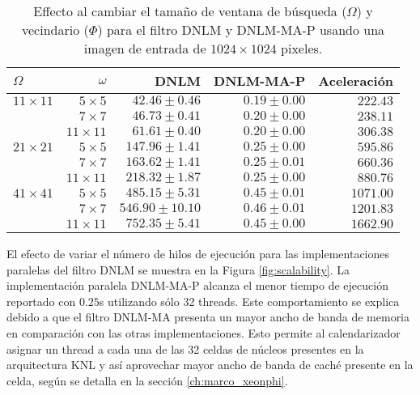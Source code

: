 \begin{table}
\protect\caption[Efecto al cambiar parámetros $\Omega$ y $\Phi$]{Effecto al cambiar el tama\~no de ventana de búsqueda ($\Omega$) y vecindario ($\Phi$) para el filtro DNLM y DNLM-MA-P usando una imagen de entrada de  $1024 \times 1024$ pixeles. \label{tabla:scala2}}
\centering
\begin{tabular}{lrrrr}
$\Omega$  & $\omega$ & DNLM \left[s\right]& DNLM-MA-P \left[s\right]& Aceleración \left[x\right]\tabularnewline
\hline
$11 \times 11$ & $5 \times 5$ & $42.46\pm0.46$ & $0.19\pm0.00$ & $222.43$ \tabularnewline
 & $7 \times 7$ & $46.73\pm0.41$ & $0.20\pm0.00$ & $238.11$ \tabularnewline
 & $11 \times 11$ & $61.61\pm0.40$ & $0.20\pm0.00$ & $306.38$ \tabularnewline
$21 \times 21$ & $5 \times 5$ & $147.96\pm1.41$ & $0.25\pm0.00$ & $595.86$ \tabularnewline
 & $7 \times 7$ & $163.62\pm1.41$ & $0.25\pm0.01$ & $660.36$ \tabularnewline
 & $11 \times 11$ & $218.32\pm1.87$ & $0.25\pm0.00$ & $880.76$ \tabularnewline
 $41 \times 41$ & $5 \times 5$ & $485.15\pm5.31$ & $0.45\pm0.01$ & $1071.00$ \tabularnewline
 & $7 \times 7$ & $546.90\pm10.10$ & $0.46\pm0.01$ & $1201.83$ \tabularnewline
 & $11 \times 11$ & $752.35\pm5.41$ & $0.45\pm0.00$ & $1662.90$ \tabularnewline
\end{tabular}
\end{table}




El efecto de variar el número de hilos de ejecución para las implementaciones paralelas del filtro DNLM se muestra en la Figura \ref{fig:scalability}. La implementación paralela DNLM-MA-P alcanza el menor tiempo de ejecución reportado con $0.25$s utilizando sólo 32 threads. Este comportamiento se explica debido a que el filtro DNLM-MA presenta un mayor ancho de banda de memoria en comparación con las otras implementaciones. Esto permite al calendarizador asignar un thread a cada una de las 32 celdas de núcleos presentes en la arquitectura  KNL y así aprovechar mayor ancho de banda de caché presente en la celda, según se detalla en la sección \ref{ch:marco_xeonphi}. 







